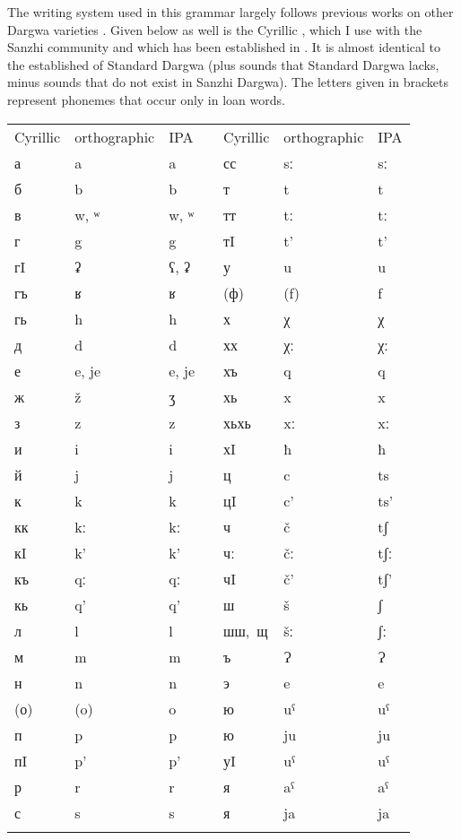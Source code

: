 \label{Orthographic conventions}

The writing system used in this grammar largely follows previous works on other Dargwa varieties \citep{Sumbatova.Mutalov2003, Sumbatova.Lander2014}. Given below as well is the Cyrillic , which I use with the Sanzhi community and which has been established in \citet{Forker.Gadzhimuradov2017}. It is almost identical to the established  of Standard Dargwa (plus sounds that Standard Dargwa lacks, minus sounds that do not exist in Sanzhi Dargwa). The letters given in brackets represent phonemes that occur only in loan words.
%
\largerpage[2]
\begin{table}[h!]
	\centering
	\small
	\begin{tabularx}{0.8\textwidth}[]{lllXlll}
	\lsptoprule
			Cyrillic &	orthographic &	IPA	&	{}	&	Cyrillic &	orthographic &	IPA\\
		\cmidrule{1-3} \cmidrule{5-7}
			а	&	a	&	a	&	{}	&	сс	&	sː	&	sː\\
			б	&	b	&	b	&	{}	&	т	&	t	&	t\\
			в	&	w, ʷ	&	w, ʷ	&	{}	&	тт	&	tː	&	tː\\
			г	&	g 	&	g	&	{}	&	тI	&	t’	&	t’\\
			гI	&	ʡ	&	ʕ, ʡ	&	{}	&	у	&	u	&	u\\
			гъ	&	ʁ	&	ʁ	&	{}	&	(ф)	&	(f)	&	f\\
			гь	&	h	&	h	&	{}	&	х	&	χ	&	χ\\
			д	&	d	&	d	&	{}	&	хх	&	χː	&	χː\\
			е	&	e, je	&	e, je	&	{}	&	хъ	&	q	&	q\\	
			ж	&	ž	&	ʒ	&	{}	&	хь	&	x	&	x\\   
			з	&	z	&	z	&	{}	&	хьхь	&	xː	&	xː\\
			и	&	i	&	i	&	{}	&	хI	&	ħ	&	ħ\\
			й	&	j	&	j	&	{}	&	ц	&	c	&	ts\\
			к	&	k	&	k	&	{}	&	цI	&	c’	&	ts’\\
			кк	&	kː	&	kː	&	{}	&	ч	&	č	&	tʃ\\
			кI	&	k’	&	k’	&	{}	&	чː	&	čː	&	tʃː\\
			къ	&	qː	&	qː	&	{}	&	чI	&	č’	&	tʃ’\\
			кь	&	q’	&	q’	&	{}	&	ш	&	š	&	ʃ\\
			л	&	l	&	l	&	{}	&	\mbox{шш, щ}& šː	&	ʃː\\
			м	&	m	&	m	&	{}	&	ъ	&	Ɂ	&	Ɂ\\
			н	&	n	&	n	&	{}	&	э	&	e	&	e\\
			(о)	&	(o)	&	o	&	{}	&	ю	&	uˁ	&	uˁ\\
			п	&	p	&	p	&	{}	&	ю	&	ju	&	ju\\
			пI	&	p’	&	p’	&	{}	&	уI	&	uˁ	&	uˁ\\
			р	&	r	&	r	&	{}	&	я	&	aˁ	&	aˁ\\
			с	&	s	&	s	&	{}	&	я	&	ja	&	ja\\
			\lspbottomrule
	\end{tabularx}
\end{table}


